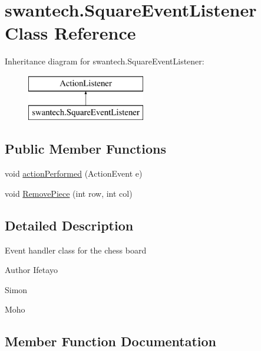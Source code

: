\hypertarget{classswantech_1_1_square_event_listener}{}\section{swantech.\+Square\+Event\+Listener Class Reference}
\label{classswantech_1_1_square_event_listener}
Inheritance diagram for swantech.\+Square\+Event\+Listener\+:\begin{figure}[H]
\begin{center}
\leavevmode
\includegraphics[height=2.000000cm]{classswantech_1_1_square_event_listener}
\end{center}
\end{figure}
\subsection*{Public Member Functions}
\begin{DoxyCompactItemize}
\item 
void \hyperlink{classswantech_1_1_square_event_listener_a5727ee3cd7853e04b1407ead3b1ad73d}{action\+Performed} (Action\+Event e)
\item 
void \hyperlink{classswantech_1_1_square_event_listener_a20ec344e232ddf50aaf2ecac0d26587e}{Remove\+Piece} (int row, int col)
\end{DoxyCompactItemize}


\subsection{Detailed Description}
Event handler class for the chess board \begin{DoxyAuthor}{Author}
Ifetayo 

Simon 

Moho 
\end{DoxyAuthor}


\subsection{Member Function Documentation}
\hypertarget{classswantech_1_1_square_event_listener_a5727ee3cd7853e04b1407ead3b1ad73d}{}
